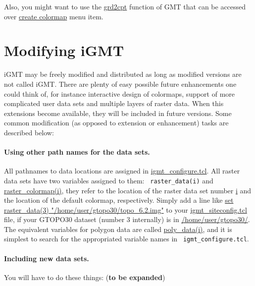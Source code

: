 \documentclass[11pt]{article}
\begin{document}
Also, you might want to use the \url{grd2cpt} function of GMT that
can be accessed over \url{create colormap} menu item.


\section{Modifying iGMT}

iGMT may be freely modified and distributed as long as modified
versions are not called iGMT. There are plenty of easy possible future
enhancements one could think of, for instance interactive design of
colormaps, support of more complicated user data sets and multiple
layers of raster data. When this extensions become available, they
will be included in future versions. Some common modification (as
opposed to extension or enhancement) tasks are described below:

\paragraph{Using other path names for the data sets.} 

All pathnames to data locations are assigned in \url{igmt_configure.tcl}. 
All raster data sets have two variables assigned to them: {\tt
  raster\_data(i)} and \url{raster_colormap(i)}, they refer to the
location of the raster data set number \url{i} and the location of the 
default colormap, respectively. Simply add a line like
\url{set raster_data(3) "/home/user/gtopo30/topo_6.2.img"}
to your \url{igmt_siteconfig.tcl} file, if your GTOPO30 dataset
(number 3 internally) is in \url{/home/user/gtopo30/}. The equivalent
variables for polygon data are called \url{poly_data(i)}, and it is
simplest to search for the appropriated variable names in {\tt
  igmt\_configure.tcl}. 


\paragraph{Including new data sets.}

You will have to do these things: ({\bf to be expanded})
\end{document}
